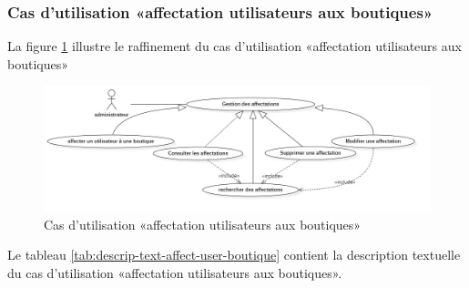 \subsubsection{Cas d’utilisation «affectation  utilisateurs aux boutiques»}
La figure \ref{fig:usecase-affectation} illustre le raffinement du cas d’utilisation «affectation utilisateurs aux boutiques»
\begin{figure}[H]
	\centering
	\includegraphics[width=1\linewidth]{"img/conception/usecases/sprint 2/UseCase-affectation"}
	\caption[Diagramme cas d’utilisation «affectation utilisateurs aux boutiques»]{Cas d’utilisation «affectation utilisateurs aux boutiques»}
	\label{fig:usecase-affectation}
\end{figure}
Le tableau \ref{tab:descrip-text-affect-user-boutique} contient la description textuelle du cas d’utilisation «affectation utilisateurs aux boutiques».
